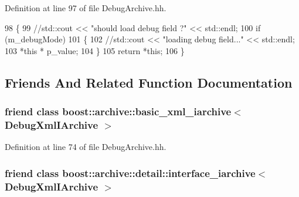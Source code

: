 Definition at line 97 of file Debug\-Archive.\-hh.


\begin{DoxyCode}
98   \{
99     \textcolor{comment}{//std::cout << "should load debug field ?" << std::endl;}
100     \textcolor{keywordflow}{if} (m\_debugMode)
101     \{
102       \textcolor{comment}{//std::cout << "loading debug field..." << std::endl;}
103       *\textcolor{keyword}{this} * p\_value;
104     \}
105     \textcolor{keywordflow}{return} *\textcolor{keyword}{this};
106   \}
\end{DoxyCode}


\subsection{Friends And Related Function Documentation}
\hypertarget{classxtd_1_1serializer_1_1DebugXmlIArchive_a54affbd4684171cc9e5cabf2db73ffe5}{
\subsubsection[{boost\-::archive\-::basic\-\_\-xml\-\_\-iarchive$<$ Debug\-Xml\-I\-Archive $>$}]{\setlength{\rightskip}{0pt plus 5cm}friend class boost\-::archive\-::basic\-\_\-xml\-\_\-iarchive$<$ {\bf Debug\-Xml\-I\-Archive} $>$\hspace{0.3cm}{\ttfamily [friend]}}}\label{classxtd_1_1serializer_1_1DebugXmlIArchive_a54affbd4684171cc9e5cabf2db73ffe5}


Definition at line 74 of file Debug\-Archive.\-hh.

\hypertarget{classxtd_1_1serializer_1_1DebugXmlIArchive_a54f75e33da74496cd06e608f4bec85dc}{
\subsubsection[{boost\-::archive\-::detail\-::interface\-\_\-iarchive$<$ Debug\-Xml\-I\-Archive $>$}]{\setlength{\rightskip}{0pt plus 5cm}friend class boost\-::archive\-::detail\-::interface\-\_\-iarchive$<$ {\bf Debug\-Xml\-I\-Archive} $>$\hspace{0.3cm}{\ttfamily [friend]}}}\label{classxtd_1_1serializer_1_1DebugXmlIArchive_a54f75e33da74496cd06e608f4bec85dc}


